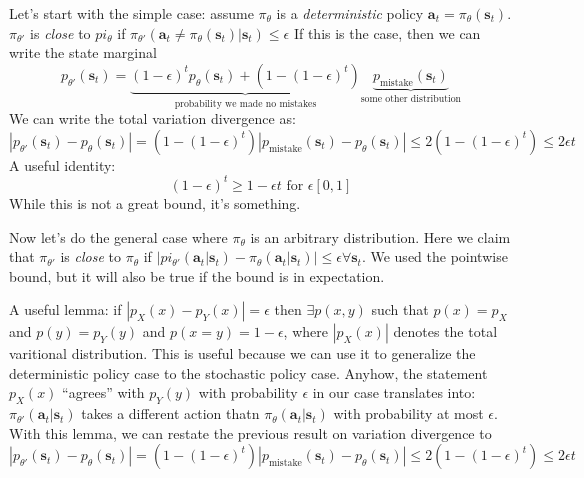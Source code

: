 \documentclass{report}
\begin{document}
Let's start with the simple case:
assume $ \pi_{ \theta }  $ is a \textit{deterministic} policy $ \bm{a}_{t} = \pi_{ \theta } (\bm{s}_{t})  $.
$ \pi_{ \theta' }  $ is \textit{close} to $ pi_{ \theta }  $ if
$ \pi_{ \theta' } (\bm{a}_{t} \neq  \pi_{ \theta } (\bm{s}_{t})|\bm{s}_{t}) \leq \epsilon $
If this is the case, then we can write the state marginal
\begin{equation}
		p_{ \theta' } (\bm{s}_{t}) = 
		\underbrace{		(1 -\epsilon )^{ t } p_{ \theta } (\bm{s}_{t}) + (1 - (1 - \epsilon)^{ t }) }_{ \text{probability we made no mistakes} }
		\underbrace{p_{ \text{mistake}} (\bm{s}_{t}) }_{ \text{some other distribution} }
\end{equation}
We can write the total variation divergence as:
\begin{equation}
		\left| p_{ \theta' } (\bm{s}_{t}) - p_{ \theta } (\bm{s}_{t}) \right| =
		(1 - (1 - \epsilon)^{ t }) \left| p_{ \text{mistake} } (\bm{s}_{t}) - p_{ \theta } (\bm{s}_{t}) \right| 
		\leq 2 (1 - (1 -\epsilon )^{ t }) \leq 2\epsilon t
\end{equation}
A useful identity:
\begin{equation}
		(1 - \epsilon)^{ t } \geq 1 - \epsilon t \text{ for } \epsilon [0,1]
\end{equation}
While this is not a great bound, it's something.

Now let's do the general case where $ \pi_{ \theta }  $ is an arbitrary distribution.
Here we claim that $ \pi_{ \theta' }  $ is \textit{close} to $ \pi_{ \theta }  $ if 
$ \left| pi_{ \theta' } (\bm{a}_{t}| \bm{s}_{t} ) - \pi_{ \theta } (\bm{a}_{t}| \bm{s}_{t} ) \right| \leq \epsilon \forall \bm{s}_{t}   $.
We used the pointwise bound, but it will also be true if the bound is in expectation.

A useful lemma:
if
$   		\left| p_{ X } (x) - p_{ Y} (x) \right| = \epsilon $
then $ \exists p(x,y)  $ such that $ p(x) = p_{ X }  $ and $ p(y) = p_{ Y }(y)  $ and
$ p(x=y) = 1 - \epsilon  $,
where $ \left|    p_{ X }(x)  \right|$ denotes the total varitional distribution.
This is useful because we can use it to generalize the deterministic policy case to the stochastic policy case.
Anyhow, the statement $ p_{ X }(x)  $ ``agrees'' with $ p_{ Y }(y)  $ with probability $ \epsilon  $
in our case translates into:
$ \pi_{ \theta' } (\bm{a}_{t}| \bm{s}_{t} )  $ takes a different action thatn $ \pi_{ \theta } (\bm{a}_{t}| \bm{s}_{t} )  $ with 
probability at most $ \epsilon  $.
With this lemma, we can restate the previous result on variation divergence to
\begin{equation}
		\left| p_{ \theta' } (\bm{s}_{t}) - p_{ \theta }(\bm{s}_{t}) \right|
		= (1 - (1-\epsilon)^{ t })  
		\left| p_{ \text{mistake} } (\bm{s}_{ t }) - p_{ \theta } (\bm{s}_{t}) \right| 
		\leq 2(1 - (1-\epsilon)^{ t }) \leq 2 \epsilon t
\end{equation}
\end{document}
